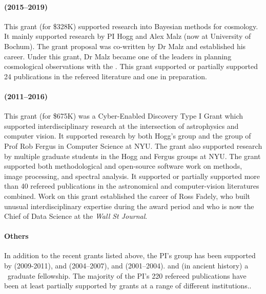 \documentclass[12pt, fullpage, letterpaper]{article}
\begin{document}
\paragraph{
(2015--2019)} This grant (for \$328K) supported research into Bayesian
methods for cosmology. It mainly supported research by PI Hogg and
Alex Malz (now at University of Bochum). The grant proposal was co-written
by Dr Malz and established his career.
Under this grant, Dr Malz became one of the leaders in planning cosmological
observations with the .
This grant supported or partially supported 24 publications
in the refereed literature and one in preparation.

\paragraph{
 (2011--2016)}
This grant (for \$675K) was a Cyber-Enabled Discovery Type I Grant
which supported interdisciplinary research at the intersection of
astrophysics and computer vision.  It supported research by both
Hogg's group and the group of Prof Rob Fergus in Computer Science at
NYU.
The grant also supported research by multiple graduate students in the
Hogg and Fergus groups at NYU.
The grant supported both methodological and open-source software work
on  methods, image processing, and spectral analysis.
It supported or partially supported
more than 40 refereed publications in the astronomical and
computer-vision literatures combined.
Work on this grant established the career of Ross Fadely, who built unusual
interdisciplinary expertise during the award period and who is now the
Chief of Data Science at the \textit{Wall St Journal}.

\paragraph{Others}
In addition to the recent grants listed above, the PI's group has been supported by
 (2009-2011),
and
 (2004--2007),
and
 (2001--2004).
and (in ancient history) a \NSF\ graduate fellowship.
The majority of the PI's 220 refereed publications have been at least partially supported
by \NSF grants at a range of different institutions..
\end{document}
